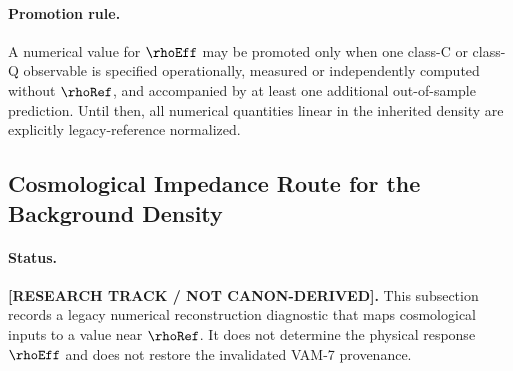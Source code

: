 \paragraph{Promotion rule.}
A numerical value for \(\rhoEff\) may be promoted only when one class-C or
class-Q observable is specified operationally, measured or independently
computed without \(\rhoRef\), and accompanied by at least one additional
out-of-sample prediction.  Until then, all numerical quantities linear in
the inherited density are explicitly legacy-reference normalized.

\subsection{Cosmological Impedance Route for the Background Density}
\label{sec:rt_rhof_cosmological_impedance_route}

\paragraph{Status.}
\textbf{[RESEARCH TRACK / NOT CANON-DERIVED].}
This subsection records a legacy numerical reconstruction diagnostic that
maps cosmological inputs to a value near \(\rhoRef\).  It does not determine
the physical response \(\rhoEff\) and does not restore the invalidated
VAM-7 provenance.

